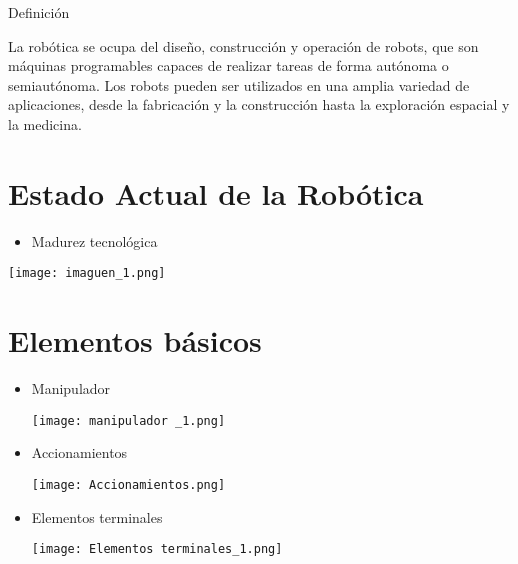 \documentclass[12pt, Letterpaper]{article}
\begin{document}
\begin{landscape}
     \begin{center}
         {\Huge Definición}
     \end{center} 

{\Large La robótica se ocupa del diseño, construcción y operación de robots, que son máquinas programables capaces de realizar tareas de forma autónoma o semiautónoma. Los robots pueden ser utilizados en una amplia variedad de aplicaciones, desde la fabricación y la construcción hasta la exploración espacial y la medicina.} 

\vspace{0.5cm}

\section{Estado Actual de la Robótica}

\begin{itemize}
    \item {\large Madurez tecnológica}
\end{itemize}

\begin{center}
    \texttt{[image: imaguen\_1.png]}\\
\end{center}
\vspace{0.0cm}


 \section{Elementos básicos}
\begin{itemize}

    \item {\large Manipulador}
\begin{center}
    \texttt{[image: manipulador \_1.png]}\\
\end{center}
\vspace{5.0cm}
    
    \item {\large Accionamientos}
    \begin{center}
    \texttt{[image: Accionamientos.png]}\\
\end{center}
\vspace{0.0cm}

    \item {\large Elementos terminales}
    \begin{center}
    \texttt{[image: Elementos terminales\_1.png]}\\
\end{center}
\vspace{0.0cm}
    

\end{itemize}
\end{landscape}
\end{document}
